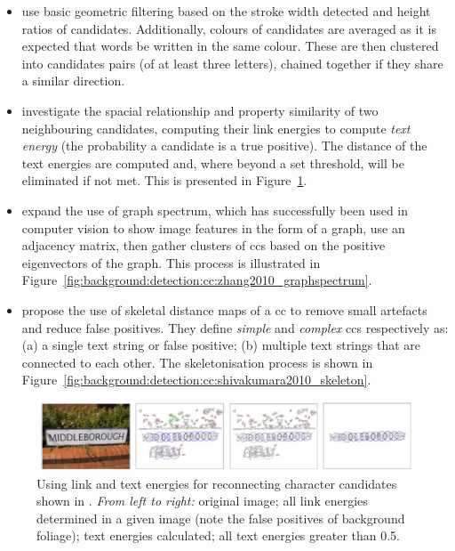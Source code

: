 \begin{itemize}
  \item \citet{Epshtein:2010tj} use basic geometric filtering based on the stroke width detected and height ratios of candidates. Additionally, colours of candidates are averaged as it is expected that words be written in the same colour. These are then clustered into candidates pairs (of at least three letters), chained together if they share a similar direction.
  \item \citet{Zhang:2011cl} investigate the spacial relationship and property similarity of two neighbouring candidates, computing their link energies to compute \textit{text energy} (the probability a candidate is a true positive). The distance of the text energies are computed and, where beyond a set threshold, will be eliminated if not met. This is presented in Figure~\ref{fig:background:detection:cc:zhang2011_textenergy}.
  \item \citet{Zhang:2010wa} expand the use of graph spectrum, which has successfully been used in computer vision \citep{Sarkar:1996ig} to show image features in the form of a graph, use an adjacency matrix, then gather clusters of \glspl{cc} based on the positive eigenvectors of the graph. This process is illustrated in Figure~\ref{fig:background:detection:cc:zhang2010_graphspectrum}.
  \item \citet{Shivakumara:2011dn} propose the use of skeletal distance maps of a \gls{cc} to remove small artefacts and reduce false positives. They define \textit{simple} and \textit{complex} \glspl{cc} respectively as: (a) a single text string or false positive; (b) multiple text strings that are connected to each other. The skeletonisation process is shown in Figure~\ref{fig:background:detection:cc:shivakumara2010_skeleton}.
\end{itemize}
 
\begin{figure}[p!]
  \centering
  \includegraphics[width=\textwidth]{images/background/zhang2011_textenergy}
  \caption[Text energy for connecting candidates back together]{Using link and text energies for reconnecting character candidates shown in \citet{Zhang:2011cl}. \textit{From left to right:} original image; all link energies determined in a given image (note the false positives of background foliage); text energies calculated; all text energies greater than 0.5.}
  \label{fig:background:detection:cc:zhang2011_textenergy}
\end{figure}

